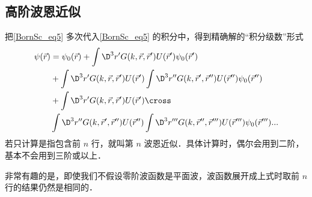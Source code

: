 \subsection{高阶波恩近似}
把\autoref{BornSc_eq5} 多次代入\autoref{BornSc_eq5} 的积分中，得到精确解的“积分级数”形式
 \begin{equation}
\begin{aligned}
  \psi (\vec r) &= {\psi _0}(\vec r) + \int {{\D ^3}r'G(k,\vec r,\vec r')U(\vec r'){\psi _0}(\vec r')}  \hfill \\
&+ \int {{\D ^3}r'G(k,\vec r,\vec r')U(\vec r')\int {{\D ^3}r''G(k,\vec r',\vec r'')U(\vec r''){\psi _0}(\vec r'')} }  \hfill \\
&+ \int {\D ^3}r'G(k,\vec r,\vec r')U(\vec r')\cross\\
&\int {{\D ^3}r''G(k,\vec r',\vec r'')U(\vec r'')\int {{\D ^3}r'''G(k,\vec r'',\vec r''')U(\vec r''')} } {\psi _0}(\vec r''')
  ... 
\end{aligned}
\end{equation}
若只计算是指包含前 $n$ 行，就叫第 $n$ 波恩近似．具体计算时，偶尔会用到二阶，基本不会用到三阶或以上．

非常有趣的是，即使我们不假设零阶波函数是平面波，波函数展开成上式时取前 $n$ 行的结果仍然是相同的．
